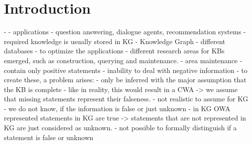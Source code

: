 \chapter{Introduction}
\label{ch:introduction}







- 
- applications 
    - question answering, dialogue agents, recommendation systems
- required knowledge is usually stored in KG
- Knowledge Graph
- different databases
- to optimize the applications
- different research areas for \acp{KB} emerged, 
such as  construction, querying and maintenance.
- area maintenance
- contain only positive statements
- inability to deal with negative information
- to create these, a problem arises: 
- only be inferred with the major assumption that the KB is complete
- like in reality, this would result in a \ac{CWA}
-> we assume that missing statements represent their falseness.
- not realistic to assume for KG
- we do not know, if the information is false or just unknown
- in KG \ac{OWA} represented statements in KG are true
-> statements that are not represented in \ac{KG} are just considered as unknown.
- not possible to formally distinguish if a statement is false or unknown



